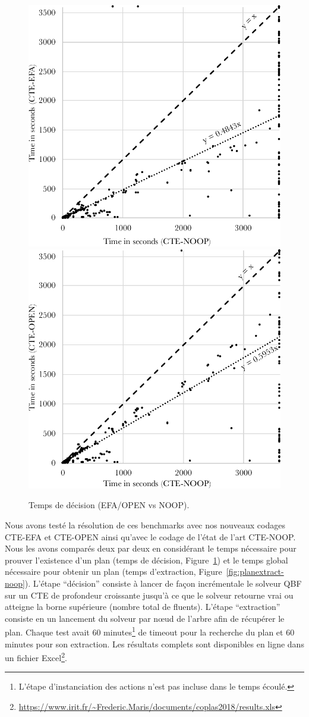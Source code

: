 \begin{figure}[ht!] \centering
\begin{center} \includegraphics[width=.48\textwidth]{figures/time-plansat-efa-noop3} %
\hfill
\includegraphics[width=.48\textwidth]{figures/time-plansat-open-noop3} \end{center}
\caption{Temps de décision (EFA/OPEN vs NOOP).}
\label{fig:plansat-noop}
\end{figure}

Nous avons testé la résolution de ces benchmarks avec nos nouveaux codages CTE-EFA et CTE-OPEN ainsi qu'avec le codage de l'état de l'art CTE-NOOP. Nous les avons comparés deux par deux en considérant le temps nécessaire pour prouver l'existence d'un plan (temps de décision, Figure~\ref{fig:plansat-noop}) et le temps global nécessaire pour obtenir un plan (temps d'extraction, Figure~\ref{fig:planextract-noop}). L'étape \enquote{décision} consiste à lancer de façon incrémentale le solveur QBF sur un CTE de profondeur croissante jusqu'à ce que le solveur retourne vrai ou atteigne la borne supérieure (nombre total de fluents). L'étape \enquote{extraction} consiste en un lancement du solveur par n\oe ud de l'arbre afin de récupérer le plan. Chaque test avait 60 minutes\footnote{L'étape d'instanciation des actions n'est pas incluse dans le temps écoulé.} de timeout pour la recherche du plan et 60 minutes pour son extraction.
Les résultats complets sont disponibles en ligne dans un fichier Excel\footnote{\url{https://www.irit.fr/~Frederic.Maris/documents/coplas2018/results.xls}}.

